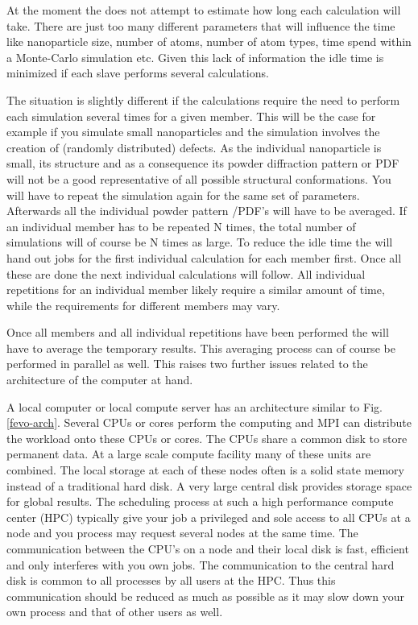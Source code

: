 At the moment the \Suite does not attempt to estimate how long
each calculation will take. There are just too many different parameters
that will influence the time like nanoparticle size, number of atoms, number
of atom types, time spend within a Monte-Carlo simulation etc. Given this
lack of information the idle time is minimized if each slave performs 
several calculations.  

The situation is slightly different if the calculations require the need 
to perform each simulation several times for a given member. This will be 
the case for example if you simulate small nanoparticles and the simulation
involves the creation of (randomly distributed) defects. As the individual
nanoparticle is small, its structure and as a consequence its powder 
diffraction pattern or PDF will not be a good representative of all possible 
structural conformations. You will have to repeat the simulation again for the 
same set of parameters. Afterwards all the individual powder pattern /PDF's
will have to be averaged. If an individual member has to be repeated N times,
the total number of simulations will of course be N times as large. To reduce 
the idle time the \Suite will hand out jobs for the first individual calculation
for each member first. Once all these are done the next individual calculations
will follow. All individual repetitions for an individual member likely
require a similar amount of time, while the requirements for different members 
may vary.

Once all members and all individual repetitions have been performed the \Suite
will have to average the temporary results. This averaging process can of 
course be performed in parallel as well. This raises two further issues 
related to the architecture of the computer at hand. 

A local computer or local compute server has an architecture similar to 
Fig. \ref{fevo-arch}. Several 
CPUs or cores perform the computing and MPI can distribute the workload onto 
these CPUs or cores. The CPUs share a common disk to store permanent data. 
At a large scale compute facility many of these units are combined. The local 
storage at each of these nodes often is a solid state memory instead of a 
traditional hard disk. A very large central disk provides storage space for 
global results. The scheduling process at such a high performance compute
center (HPC) typically give your job a privileged and sole access to all CPUs at 
a node and you process may request several nodes at the same time. The 
communication between the CPU's on a node and their local 
disk is fast, efficient and only interferes with you own jobs. The communication
to the central hard disk is common to all processes by all users at the HPC. 
Thus this communication should be reduced as much as possible as it may slow 
down your own process and that of other users as well. 

